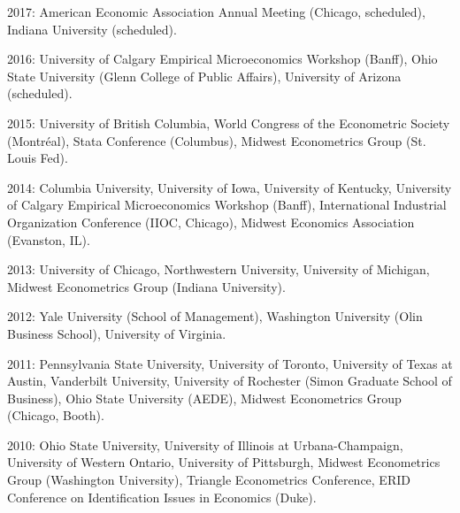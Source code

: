 \documentclass[10pt,letterpaper]{article}
\renewenvironment{itemize}{
  \begin{list}{}{
    \setlength{\leftmargin}{1.5em}
    \setlength{\itemsep}{0.25em}
    \setlength{\parskip}{0pt}
    \setlength{\parsep}{0.25em}
  }
}{
  \end{list}
}
\begin{document}
\begin{itemize}
\item 2017:
  American Economic Association Annual Meeting (Chicago, scheduled),
  Indiana University (scheduled).
\item 2016:
  University of Calgary Empirical Microeconomics Workshop (Banff),
  Ohio State University (Glenn College of Public Affairs),
  University of Arizona (scheduled).
\item 2015:
  University of British Columbia,
  World Congress of the Econometric Society (Montr\'{e}al),
  Stata Conference (Columbus),
  Midwest Econometrics Group (St. Louis Fed).
\item 2014:
  Columbia University,
  University of Iowa,
  University of Kentucky,
  University of Calgary Empirical Microeconomics Workshop (Banff),
  International Industrial Organization Conference (IIOC, Chicago),
  Midwest Economics Association (Evanston, IL).
\item 2013:
  University of Chicago,
  Northwestern University,
  University of Michigan,
  Midwest Econometrics Group (Indiana University).
\item 2012:
  Yale University (School of Management),
  Washington University (Olin Business School),
  University of Virginia.
\item 2011:
  Pennsylvania State University,
  University of Toronto,
  University of Texas at Austin,
  Vanderbilt University,
  University of Rochester (Simon Graduate School of Business),
  Ohio State University (AEDE),
  Midwest Econometrics Group (Chicago, Booth).
\item 2010:
  Ohio State University,
  University of Illinois at Urbana-Champaign,
  University of Western Ontario,
  University of Pittsburgh,
  Midwest Econometrics Group (Washington University),
  Triangle Econometrics Conference,
  ERID Conference on Identification Issues in Economics (Duke).
\end{itemize}
\end{document}
